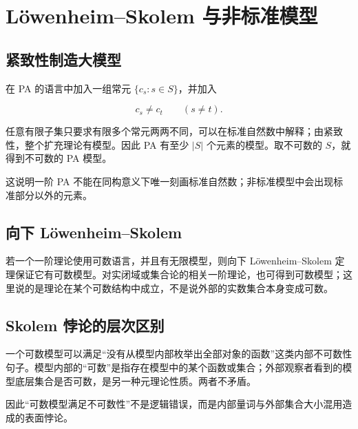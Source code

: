 \section{Löwenheim–Skolem 与非标准模型}


\subsection{紧致性制造大模型}


在 PA 的语言中加入一组常元 $\{c_s:s\in S\}$，并加入

\[
c_s\ne c_t\qquad(s\ne t).
\]

任意有限子集只要求有限多个常元两两不同，可以在标准自然数中解释；由紧致性，整个扩充理论有模型。因此 PA 有至少 $|S|$ 个元素的模型。取不可数的 $S$，就得到不可数的 PA 模型。

这说明一阶 PA 不能在同构意义下唯一刻画标准自然数；非标准模型中会出现标准部分以外的元素。

\subsection{向下 Löwenheim–Skolem}


若一个一阶理论使用可数语言，并且有无限模型，则向下 Löwenheim–Skolem 定理保证它有可数模型。对实闭域或集合论的相关一阶理论，也可得到可数模型；这里说的是理论在某个可数结构中成立，不是说外部的实数集合本身变成可数。

\subsection{Skolem 悖论的层次区别}


一个可数模型可以满足“没有从模型内部枚举出全部对象的函数”这类内部不可数性句子。模型内部的“可数”是指存在模型中的某个函数或集合；外部观察者看到的模型底层集合是否可数，是另一种元理论性质。两者不矛盾。

因此“可数模型满足不可数性”不是逻辑错误，而是内部量词与外部集合大小混用造成的表面悖论。
